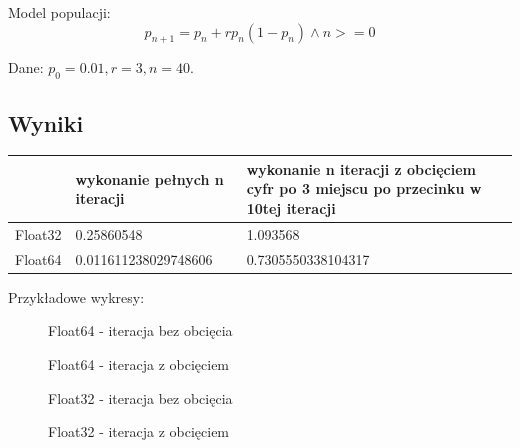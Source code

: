 \documentclass{article}
\begin{document}
Model populacji:
\[p_{n+1} = p_{n} + rp_{n}(1 - p_{n}) \land n >= 0\]

Dane: $p_{0} = 0.01, r = 3, n = 40$.
\subsection{Wyniki}
\begin{center}
  \begin{tabular}{l|l|p{8cm}}
    & wykonanie pełnych n iteracji & wykonanie n iteracji z obcięciem cyfr po 3 miejscu po przecinku w 10tej iteracji\\
    \hline
    Float32 & 0.25860548 & 1.093568\\
    Float64 & 0.011611238029748606 & 0.7305550338104317
  \end{tabular}
\end{center}
Przykładowe wykresy:
\begin{figure}[h]
  \begin{minipage}{0.48\textwidth}
    \centering
    \caption{Float64 - iteracja bez obcięcia}
  \end{minipage}
  \begin{minipage}{0.48\textwidth}
    \centering
    \caption{Float64 - iteracja z obcięciem}
  \end{minipage}
  \begin{minipage}{0.48\textwidth}
    \centering
    \caption{Float32 - iteracja bez obcięcia}
  \end{minipage}
  \begin{minipage}{0.48\textwidth}
    \centering
    \caption{Float32 - iteracja z obcięciem}
  \end{minipage}
\end{figure}
\end{document}
